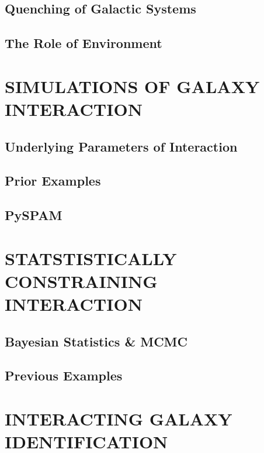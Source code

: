 \subsection{Quenching of Galactic Systems}
\subsection{The Role of Environment}

\section{SIMULATIONS OF GALAXY INTERACTION}

\subsection{Underlying Parameters of Interaction}

\subsection{Prior Examples}

\subsection{PySPAM}

\section{STATSTISTICALLY CONSTRAINING INTERACTION}

\subsection{Bayesian Statistics \& MCMC}

\subsection{Previous Examples}

\section{INTERACTING GALAXY IDENTIFICATION}

